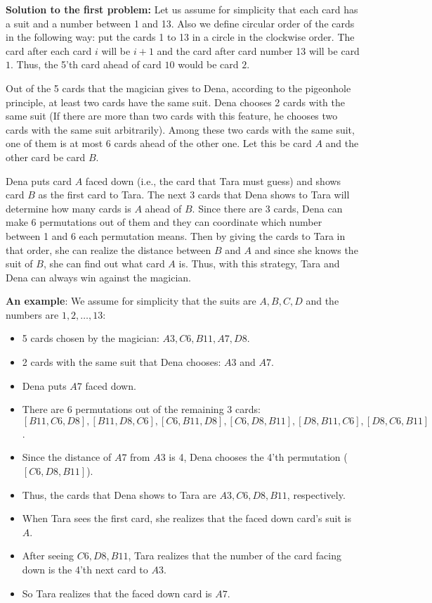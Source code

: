 \begin{solution}
\textbf{Solution to the first problem:} Let us assume for simplicity that each card has a suit and a  number between 1 and 13.
Also we define circular order of the cards in the following way: put the cards 1 to 13 in a circle in the clockwise order. The card after each card $i$ will be $i+1$ and the card after card number 13 will be card $1$. Thus, the 5'th card ahead of card $10$ would be card $2$.

Out of the 5 cards that the magician gives to Dena, according to the pigeonhole principle, at least two cards have the same suit.
Dena chooses 2 cards with the same suit (If there are more than two cards with this feature, he chooses two cards with the same suit arbitrarily).
Among these two cards with the same suit, one of them is at most 6 cards ahead of the other one. Let this be card $A$ and the other card be card $B$.

Dena puts  card $A$ faced down
(i.e., the card that Tara must guess)
and shows card $B$ as the first card to Tara. The next 3 cards that Dena shows to Tara will determine how many cards is $A$ ahead of $B$. Since there are 3 cards, Dena can make $6$ permutations out of them and they can coordinate which number between 1 and 6 each permutation means. Then by giving the cards to Tara in that order, she can realize the distance between $B$ and $A$ and since she knows the suit of $B$, she can find out what card $A$ is. Thus, with this strategy, Tara and Dena can always win against the magician.

\textbf{An example}: We assume for simplicity that the suits are $A, B, C, D$ and the numbers are $1, 2, \ldots, 13$:

\begin{itemize}
\item 5 cards chosen by the magician: $A3, C6, B11, A7, D8$.
\item 2 cards with the same suit that Dena chooses: $A3$ and $A7$.
\item Dena puts $A7$ faced down.
\item There are 6 permutations out of the remaining 3 cards: $$[B11,C6,D8], [B11,D8,C6], [C6,B11,D8], [C6,D8,B11], [D8,B11,C6] , [D8, C6, B11]$$.
\item Since the distance of $A7$ from $A3$ is 4, Dena chooses the 4'th permutation ($[C6,D8,B11]$).
\item Thus, the cards that Dena shows to Tara are $A3, C6, D8, B11$, respectively.
\item When Tara sees the first card, she realizes that the faced down card's suit is $A$.
\item After seeing $C6, D8, B11$, Tara realizes that the number of the card facing down is the 4'th next card to $A3$.
\item So Tara realizes that the faced down card is $A7$.
\end{itemize}


\end{solution}
